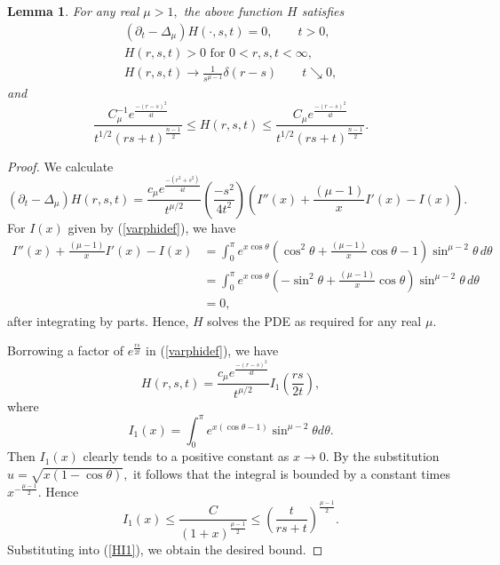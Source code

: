 \documentclass[12pt]{amsart}
\newtheorem{lemma}[thm]{Lemma}
\theoremstyle{others}
\numberwithin{equation}{section}
\newcommand{\p}{\partial}
\begin{document}
\begin{lemma}\label{lemma:euclheatker} For any real $\mu > 1,$ the above function $H$ satisfies
\begin{equation*}
\begin{split}
\left( \p_t - \Delta_\mu \right) H (\cdot, s,t) = 0, \qquad t > 0, \\
H (r,s,t) > 0 \mbox{ for } 0 < r,s,t < \infty, \\
H (r, s,t) \to \frac{1}{s^{\mu - 1}} \delta(r-s) \qquad t \searrow 0,
\end{split}
\end{equation*}
and
\begin{equation}\label{Hbound}
\frac{C_\mu^{-1} e^{\frac{-(r-s)^2}{4t}}}{t^{1/2} (rs + t)^{\frac{n-1}{2}} } \leq H(r,s,t) \leq \frac{C_\mu e^{\frac{-(r-s)^2}{4t}}}{t^{1/2} (rs + t)^{\frac{n-1}{2}} }.
\end{equation}
\end{lemma}
\begin{proof} %
We calculate
\begin{equation*}
\left( \p_t - \Delta_\mu \right) H(r,s,t) = \frac{c_\mu e^{\frac{-(r^2 + s^2)}{4t}}}{t^{\mu/2} } \left( \frac{-s^2}{4t^2} \right) \left( I''(x) + \frac{(\mu - 1)}{x} I'(x) - I(x) \right).
\end{equation*}
For $I(x)$ given by (\ref{varphidef}), we have
\begin{equation}\label{Iode}
\begin{split}
I''(x) + \frac{(\mu-1)}{x} I'(x) - I(x) & = \int_0^\pi e^{x \cos \theta} \left( \cos^2 \theta + \frac{(\mu-1)}{x}\cos\theta - 1 \right) \sin^{\mu - 2} \theta \, d\theta \\
& = \int_0^\pi e^{x \cos \theta} \left( -\sin^2 \theta + \frac{(\mu - 1)}{x}\cos\theta\right) \sin^{\mu - 2} \theta \, d\theta \\
& = 0,
\end{split}
\end{equation}
after integrating by parts.
Hence, $H$ solves the PDE as required for any real $\mu.$

Borrowing a factor of $e^{\frac{rs}{2t}}$ in (\ref{varphidef}), we have
\begin{equation}\label{HI1}
H(r,s,t) = \frac{c_\mu e^{\frac{-(r - s)^2}{4t}}}{t^{\mu/2} } I_1\left( \frac{rs}{2t} \right),
\end{equation}
where
\begin{equation*}%
I_1(x) = \int_0^\pi e^{x (\cos \theta - 1) } \sin^{\mu - 2} \theta d\theta.
\end{equation*}
Then $I_1(x)$ clearly tends to a positive constant as $x \to 0.$ By the substitution $u = \sqrt{x(1 - \cos \theta )},$ it follows that the integral is bounded by a constant times $x^{-\frac{\mu - 1}{2}}.$ Hence
$$I_1(x) \leq \frac{C}{(1 + x)^{\frac{\mu - 1}{2}}} \leq \left( \frac{t}{rs + t} \right)^{\frac{\mu - 1}{2}}.$$
Substituting into (\ref{HI1}), we obtain the desired bound.
\end{proof}
\end{document}
